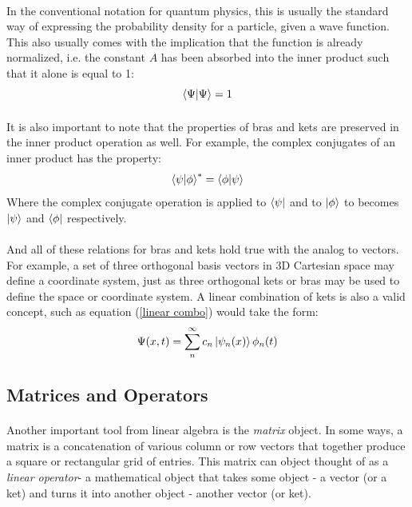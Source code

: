 \documentclass[12pt,letterpaper]{book}
\begin{document}
\paragraph*{}In the conventional notation for quantum physics, this is usually the standard way of expressing the probability density for a particle, given a wave function. This also usually comes with the implication that the function is already normalized, i.e. the constant $A$ has been absorbed into the inner product such that it alone is equal to 1:
\begin{equation}
\braket{\Psi}{\Psi} = 1
\end{equation}
\paragraph*{}It is also important to note that the properties of bras and kets are preserved in the inner product operation as well. For example, the complex conjugates of an inner product has the property:
\begin{equation}
\braket{\psi}{\phi}^* = \braket{\phi}{\psi} 
\end{equation}
Where the complex conjugate operation is applied to $\bra{\psi}$ and to $\ket{\phi}$ to becomes $\ket{\psi}$ and $\bra{\phi}$ respectively.
\paragraph*{}And all of these relations for bras and kets hold true with the analog to vectors. For example, a set of three orthogonal basis vectors in 3D Cartesian space may define a coordinate system, just as three orthogonal kets or bras may be used to define the space or coordinate system. A linear combination of kets is also a valid concept, such as equation (\ref{linear combo}) would take the form:
\begin{equation}
\label{linear combo kets}
\Psi(x,t) = \sum_n^{\infty} c_n \ket{\psi_n(x)}\phi_n(t)
\end{equation}


\subsection*{Matrices and Operators}
\paragraph*{}Another important tool from linear algebra is the \textit{matrix} object. In some ways, a matrix is a concatenation of various column or row vectors that together produce a square or rectangular grid of entries. This matrix can object thought of as a \textit{linear operator}- a mathematical object that takes some object - a vector (or a ket) and turns it into another object - another vector (or ket).
\end{document}

